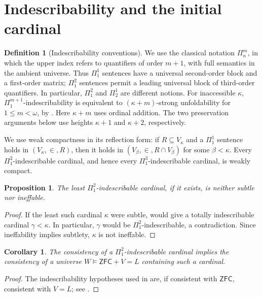 \documentclass[10pt,a4paper]{amsart}
\newtheorem{proposition}[theorem]{Proposition}
\newtheorem{corollary}[theorem]{Corollary}
\theoremstyle{definition}
\newtheorem{definition}[theorem]{Definition}
\theoremstyle{remark}
\newcommand{\ZFC}{\mathsf{ZFC}}
\begin{document}
\section{Indescribability and the initial cardinal}\label{sec:initial}

\begin{definition}[Indescribability conventions]
\label{def:indescribable}
We use the classical notation \(\Pi^m_n\), in which the upper
index refers to quantifiers of order \(m+1\), with full
semantics in the ambient universe. Thus \(\Pi^1_1\) sentences
have a universal second-order block and a first-order matrix;
\(\Pi^2_1\) sentences permit a leading universal block of
third-order quantifiers. In particular, \(\Pi^2_1\) and
\(\Pi^1_2\) are different notions.
For inaccessible \(\kappa\), \(\Pi^{m+1}_1\)-indescribability
is equivalent to \((\kappa+m)\)-strong unfoldability for
\(1\leq m<\omega\), by \cite[Corollary 35]{Johnstone}.
Here \(\kappa+m\) uses ordinal addition. The two preservation
arguments below use heights \(\kappa+1\) and \(\kappa+2\),
respectively.
\end{definition}

We use weak compactness in its reflection form: if
\(R\subseteq V_\kappa\) and a \(\Pi^1_1\) sentence holds
in \((V_\kappa,\in,R)\), then it holds in
\((V_\beta,\in,R\cap V_\beta)\) for some \(\beta<\kappa\).
Every \(\Pi^2_1\)-indescribable cardinal, and hence every
\(\Pi^3_1\)-indescribable cardinal, is weakly compact.

\begin{proposition}\label{prop:least}
The least \(\Pi^2_1\)-indescribable cardinal, if it exists,
is neither subtle nor ineffable.
\end{proposition}
\begin{proof}
If the least such cardinal \(\kappa\) were subtle,
\cite[Lemma 5.4]{HLN} would give a totally indescribable
cardinal \(\gamma<\kappa\). In particular, \(\gamma\)
would be \(\Pi^2_1\)-indescribable, a contradiction.
Since ineffability implies subtlety, \(\kappa\) is not
ineffable.
\end{proof}

\begin{corollary}\label{cor:ground}
The consistency of a \(\Pi^2_1\)-indescribable cardinal
implies the consistency of a universe
\(W\models\ZFC+V=L\) containing such a cardinal.
\end{corollary}
\begin{proof}
The indescribability hypotheses used in \cite{Johnstone}
are, if consistent with \(\ZFC\), consistent with \(V=L\);
see \cite[Section 1, p.~1215]{Johnstone}.
\end{proof}
\end{document}
